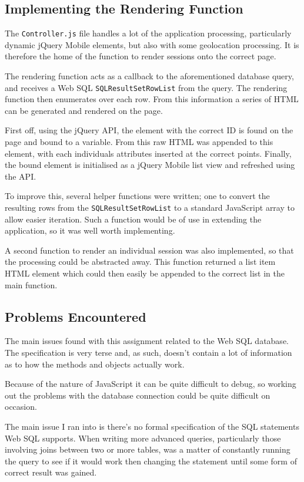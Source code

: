 \documentclass[10pt, a4paper]{article}
\begin{document}
\subsection{Implementing the Rendering Function}
The \texttt{Controller.js} file handles a lot of the application processing,
particularly dynamic jQuery Mobile elements, but also with some geolocation
processing. It is therefore the home of the function to render sessions onto
the correct page.

The rendering function acts as a callback to the aforementioned database query,
and receives a Web SQL \texttt{SQLResultSetRowList} from the query. The 
rendering function then enumerates over each row. From this information a 
series of HTML can be generated and rendered on the page.

First off, using the jQuery API, the element with the correct ID is found on 
the page and bound to a variable. From this raw HTML was appended to this
element, with each individuals attributes inserted at the correct points.
Finally, the bound element is initialised as a jQuery Mobile list view and
refreshed using the API.

To improve this, several helper functions were written; one to convert the
resulting rows from the \texttt{SQLResultSetRowList} to a standard JavaScript
array to allow easier iteration. Such a function would be of use in extending
the application, so it was well worth implementing.

A second function to render an individual session was also implemented, so that
the processing could be abstracted away. This function returned a list item 
HTML element which could then easily be appended to the correct list in the
main function.

\subsection{Problems Encountered}
The main issues found with this assignment related to the Web SQL database. The
specification is very terse and, as such, doesn't contain a lot of information
as to how the methods and objects actually work.

Because of the nature of JavaScript it can be quite difficult to debug, so
working out the problems with the database connection could be quite difficult
on occasion.

The main issue I ran into is there's no formal specification of the SQL
statements Web SQL supports. When writing more advanced queries, particularly
those involving joins between two or more tables, was a matter of constantly
running the query to see if it would work then changing the statement until
some form of correct result was gained.
\end{document}
